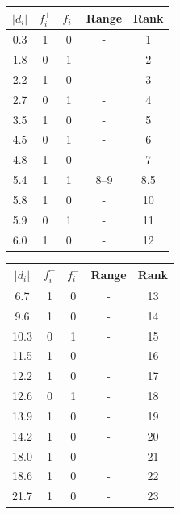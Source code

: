 \documentclass[12pt]{article}
\begin{document}
\begin{multicols}{2}
\begin{table}[H]
\large
\centering 
\begin{tabular}{|c|c c|c|c|}
\hline
$\left| d_{i} \right|$ & $f_{i}^{+}$ & $f_{i}^{-}$ & Range & Rank \\
\hline \hline
0.3 & 1 & 0 & - & 1 \\
\hline
1.8 & 0 & 1 & - & 2 \\
\hline 
2.2 & 1 & 0 & - & 3\\
\hline
2.7 & 0 & 1 & - & 4 \\
\hline
3.5 & 1 & 0 & - & 5\\
\hline
4.5 & 0 & 1 & - & 6 \\
\hline
4.8 & 1 & 0 & - & 7 \\
\hline 
5.4 & 1 & 1 & 8--9 & 8.5\\
\hline
5.8 & 1 & 0 & - & 10\\
\hline
5.9 & 0 & 1 & - & 11\\
\hline
6.0 & 1 & 0 & - & 12 \\
\hline
\end{tabular}
\end{table}
\begin{table}[H]
\large
\centering 
\begin{tabular}{|c|c c|c|c|}
\hline
$\left| d_{i} \right|$ & $f_{i}^{+}$ & $f_{i}^{-}$ & Range & Rank \\
\hline \hline
6.7 & 1 & 0 & - & 13 \\
\hline 
9.6 & 1 & 0 & - & 14\\
\hline
10.3 & 0 & 1 & - & 15\\
\hline
11.5 & 1 & 0 & - & 16 \\
\hline
12.2 & 1 & 0 & - & 17\\
\hline
12.6 & 0 & 1 & - & 18 \\
\hline
13.9 & 1 & 0 & - & 19 \\
\hline 
14.2 & 1 & 0 & - & 20\\
\hline
18.0 & 1 & 0 & - & 21\\
\hline
18.6 & 1 & 0 & - & 22\\
\hline
21.7 & 1 & 0 & - & 23 \\
\hline
\end{tabular}
\end{table}
\end{multicols}
\end{document}
